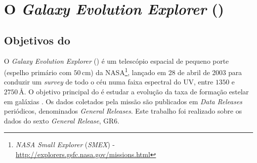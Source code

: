 


\chapter{O {\em Galaxy Evolution Explorer} (\galex)}
\label{sec:Galex}



\section{Objetivos do \galex}
\label{sec:Galex:Objetivos}

O {\em Galaxy Evolution Explorer} (\galex) é um telescópio espacial de pequeno
porte (espelho primário com $50\,\mathrm{cm}$) da NASA\footnote{{\em NASA Small
Explorer} ({\em SMEX}) - \url{http://explorers.gsfc.nasa.gov/missions.html}},
lançado em 28 de abril de 2003 para conduzir um {\em survey} de todo o céu numa
faixa espectral do UV, entre $1350$ e $2750\,\text{\AA}$. O objetivo principal
do \galex é estudar a evolução da taxa de formação estelar em galáxias
\citep{Martin2005}. Os dados coletados pela missão são publicados em {\em Data
Releases} periódicos, denominados {\em General Releases}. Este trabalho foi
realizado sobre os dados do sexto {\em General Release}, GR6.

